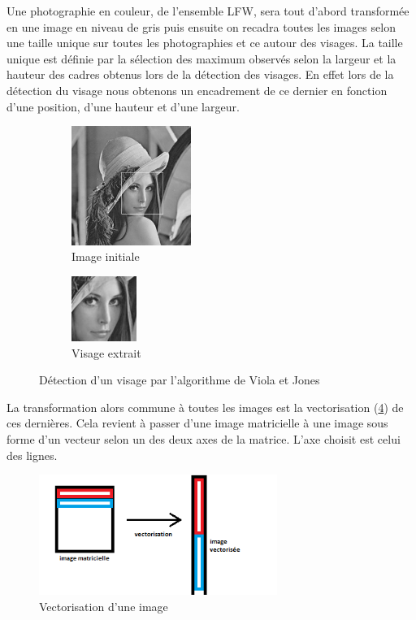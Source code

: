 \documentclass[a4paper,10pt,twocolumn]{extarticle}
\begin{document}
Une photographie en couleur, de l'ensemble LFW, sera tout d'abord transformée en une image en niveau de gris puis ensuite on recadra toutes les images selon une taille unique sur toutes les photographies et ce autour des visages. La taille unique est définie par la sélection des maximum observés selon la largeur et la hauteur des cadres obtenus lors de la détection des visages. En effet lors de la détection du visage nous obtenons un encadrement de ce dernier en fonction d'une position, d'une hauteur et d'une largeur.
\begin{figure}[H]
        \centering
        \begin{subfigure}[b]{110pt}
                \centering
                \includegraphics[width=110pt]{images_rapport/lena.png}
                \caption{Image initiale}
                \label{fig:lena}
        \end{subfigure}
        \begin{subfigure}[b]{110pt}
                \centering
                \includegraphics[width=60pt]{images_rapport/lena_face.png}
                \caption{Visage extrait}
                \label{fig:lena_face}
        \end{subfigure}
        \caption{Détection d'un visage par l'algorithme de Viola et Jones \cite{viola01}}
\end{figure}
La transformation alors commune à toutes les images est la vectorisation (\ref{fig:vectorisation}) de ces dernières. Cela revient à passer d'une image matricielle à une image sous forme d'un vecteur selon un des deux axes de la matrice. L'axe choisit est celui des lignes.
\begin{figure}[H]
  \begin{center}
    \includegraphics[width=220pt]{images_rapport/vectorisation.png}
    \caption{Vectorisation d'une image}
    \label{fig:vectorisation}
  \end{center}
\end{figure}
\end{document}

